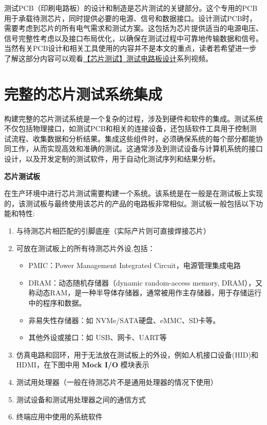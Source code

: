 测试PCB（印刷电路板）的设计和制造是芯片测试的关键部分。这个专用的PCB用于承载待测芯片，同时提供必要的电源、信号和数据接口。设计测试PCB时，需要考虑到芯片的所有电气需求和测试方案。这包括为芯片提供适当的电源电压、信号完整性考虑以及接口布局优化，以确保在测试过程中可靠地传输数据和信号。当然有关PCB设计和相关工具使用的内容并不是本文的重点，读者若希望进一步了解这部分内容可以观看\href{https://space.bilibili.com/88050003/channel/collectiondetail?sid=1952366}{【芯片测试】测试电路板设计}系列视频。

\section{完整的芯片测试系统集成}\label{sec:18-test-and-show-005}

\hspace{0pt} 构建完整的芯片测试系统是一个复杂的过程，涉及到硬件和软件的集成。测试系统不仅包括物理接口，如测试PCB和相关的连接设备，还包括软件工具用于控制测试流程、收集数据和分析结果。集成这些组件时，必须确保系统的每个部分都能协同工作，从而实现高效和准确的测试。这通常涉及到测试设备与计算机系统的接口设计，以及开发定制的测试软件，用于自动化测试序列和结果分析。

\textbf{芯片测试板}

在生产环境中进行芯片测试需要构建一个系统。该系统是在一般是在测试板上实现的，该测试板与最终使用该芯片的产品的电路板非常相似。测试板一般包括以下功能和特性:

\begin{enumerate}
\def\labelenumi{\arabic{enumi}.}
\tightlist
\item
  与待测芯片相匹配的引脚底座（实际产片则可直接焊接芯片）
\item
  可放在测试板上的所有待测芯片外设,包括：

  \begin{itemize}
  \tightlist
  \item
    PMIC：Power Management Integrated Circuit，电源管理集成电路
  \item
    DRAM：动态随机存储器（dynamic random-access memory, DRAM），又称动态RAM，是一种半导体存储器，通常被用作主存储器，用于存储运行中的程序和数据。
  \item
    非易失性存储器：如 NVMe/SATA硬盘、eMMC、SD卡等。
  \item
    其他外设或接口：如 USB、网卡、UART等
  \end{itemize}
\item
  仿真电路和回环，用于无法放在测试板上的外设，例如人机接口设备(HID)和 HDMI，在下图中用 \textbf{Mock I/O} 模块表示
\item
  测试用处理器（一般在待测芯片不是通用处理器的情况下使用）
\item
  测试设备和测试用处理器之间的通信方式
\item
  终端应用中使用的系统软件
\end{enumerate}

